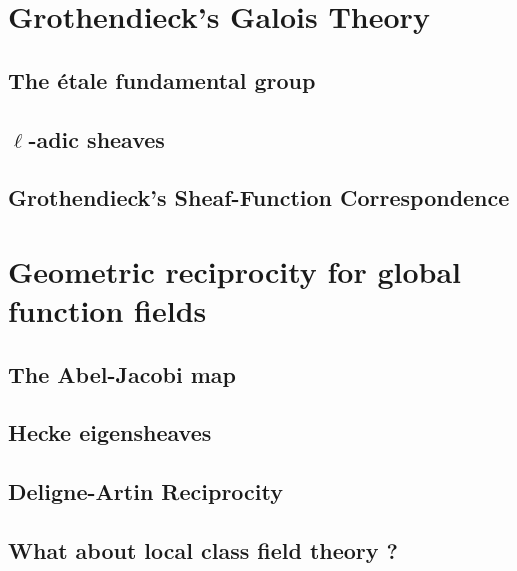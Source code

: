     \section{Grothendieck's Galois Theory}
        \subsection{The \'etale fundamental group}
        
        \subsection{\texorpdfstring{$\ell$}{}-adic sheaves}
            
        \subsection{Grothendieck's Sheaf-Function Correspondence}
    
    \section{Geometric reciprocity for global function fields}
        \subsection{The Abel-Jacobi map}
    
        \subsection{Hecke eigensheaves}
        
        \subsection{Deligne-Artin Reciprocity}
        
        \subsection{What about local class field theory ?}
	
	\printbibliography

